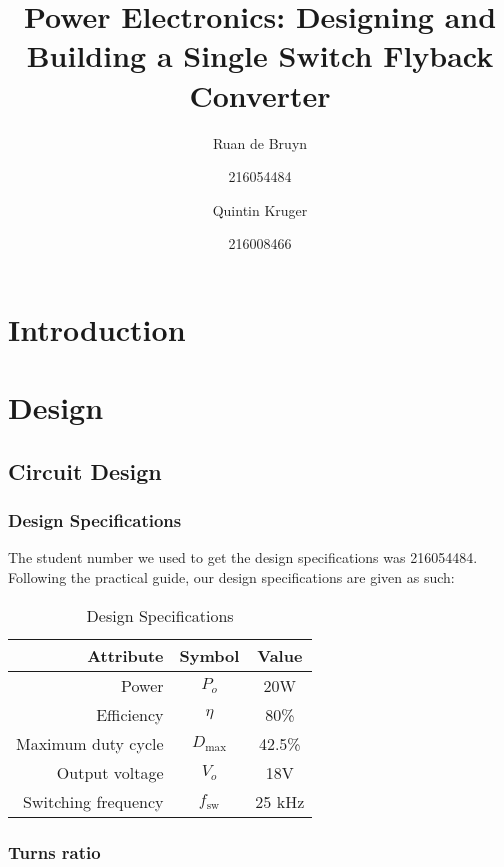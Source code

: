 \documentclass[a4paper, 12pt]{article}
\title{Power Electronics: Designing and Building a Single Switch Flyback Converter}
\author{Ruan de Bruyn \and 216054484 \and Quintin Kruger \and 216008466}
\begin{document}
\maketitle
\newpage
{}
\tableofcontents
\listoffigures
\newpage
{}

\section{Introduction}


\section{Design}

\subsection{Circuit Design}

\subsubsection{Design Specifications}

The student number we used to get the design specifications was 216054484. Following the practical guide, our design specifications are given as such:

\begin{table}[H]
  \centering
  \begin{tabular}{r c c}
    \toprule
    \textbf{Attribute} & \textbf{Symbol} & \textbf{Value} \\
    \midrule
    Power & $P_o$ & 20W \\
    Efficiency & $\eta$ & 80\% \\
    Maximum duty cycle & $D_{\text{max}}$ & 42.5\% \\
    Output voltage & $V_o$ & 18V \\
    Switching frequency & $f_{\text{sw}}$ & 25 kHz \\
    \bottomrule
  \end{tabular}
  \caption{Design Specifications}
  \label{tab:design_specs}
\end{table}

\subsubsection{Turns ratio}
\end{document}
